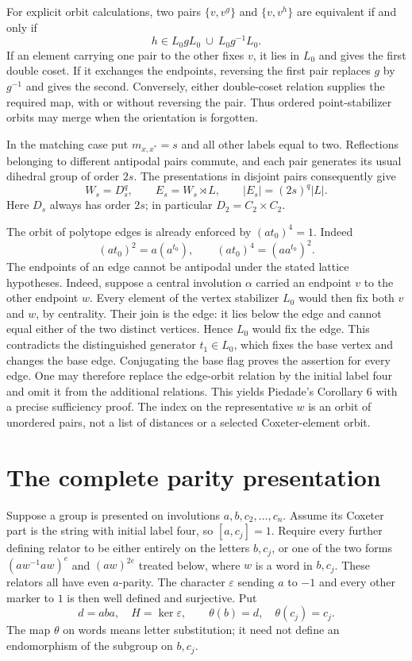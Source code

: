 For explicit orbit calculations, two pairs $\{v,v^g\}$ and $\{v,v^h\}$ are equivalent if and only if
\[
h\in L_0gL_0\ \cup\ L_0g^{-1}L_0.
\tag{O}
\]
If an element carrying one pair to the other fixes $v$, it lies in $L_0$ and gives the first double coset. If it exchanges the endpoints, reversing the first pair replaces $g$ by $g^{-1}$ and gives the second. Conversely, either double-coset relation supplies the required map, with or without reversing the pair. Thus ordered point-stabilizer orbits may merge when the orientation is forgotten.

In the matching case put \(m_{x,x^*}=s\) and all other labels equal to two. Reflections belonging to different antipodal pairs commute, and each pair generates its usual dihedral group of order \(2s\). The presentations in disjoint pairs consequently give
\[
 W_s=D_s^q,\qquad E_s=W_s\rtimes L,\qquad
 |E_s|=(2s)^q|L|.                              \tag{2}
\]
Here \(D_s\) always has order \(2s\); in particular \(D_2=C_2\times C_2\).

The orbit of polytope edges is already enforced by \((at_0)^4=1\). Indeed
\[
 (at_0)^2=a(a^{t_0}),\qquad
 (at_0)^4=(a a^{t_0})^2.
\]
The endpoints of an edge cannot be antipodal under the stated lattice hypotheses. Indeed, suppose a central involution $\alpha$ carried an endpoint $v$ to the other endpoint $w$. Every element of the vertex stabilizer $L_0$ would then fix both $v$ and $w$, by centrality. Their join is the edge: it lies below the edge and cannot equal either of the two distinct vertices. Hence $L_0$ would fix the edge. This contradicts the distinguished generator $t_1\in L_0$, which fixes the base vertex and changes the base edge. Conjugating the base flag proves the assertion for every edge. One may therefore replace the edge-orbit relation by the initial label four and omit it from the additional relations. This yields Piedade's Corollary 6 with a precise sufficiency proof. The index on the representative \(w\) is an orbit of unordered pairs, not a list of distances or a selected Coxeter-element orbit.

\section{The complete parity presentation}\label{the-complete-parity-presentation}

Suppose a group is presented on involutions \(a,b,c_2,\ldots,c_n\). Assume its Coxeter part is the string with initial label four, so \([a,c_j]=1\). Require every further defining relator to be either entirely on the letters \(b,c_j\), or one of the two forms \((a w^{-1}a w)^e\) and \((aw)^{2e}\) treated below, where \(w\) is a word in \(b,c_j\). These relators all have even \(a\)-parity. The character \(\varepsilon\) sending \(a\) to \(-1\) and every other marker to \(1\) is then well defined and surjective. Put
\[
 d=aba,\quad H=\ker\varepsilon,
 \qquad \theta(b)=d,\quad\theta(c_j)=c_j.
\]
The map \(\theta\) on words means letter substitution; it need not define an endomorphism of the subgroup on \(b,c_j\).


